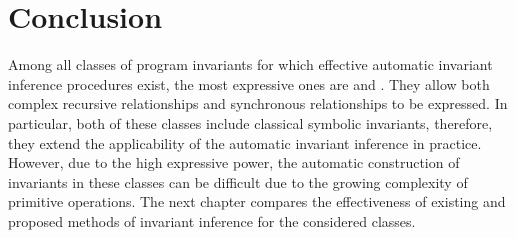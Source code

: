 \section{Conclusion}
Among all classes of program invariants for which effective automatic invariant inference procedures exist, the most expressive ones are \syncRegFullClass{} and \regelemclass{}. They allow both complex recursive relationships and synchronous relationships to be expressed. In particular, both of these classes include classical symbolic invariants, therefore, they extend the applicability of the automatic invariant inference in practice. However, due to the high expressive power, the automatic construction of invariants in these classes can be difficult due to the growing complexity of primitive operations.
The next chapter compares the effectiveness of existing and proposed methods of invariant inference for the considered classes.
